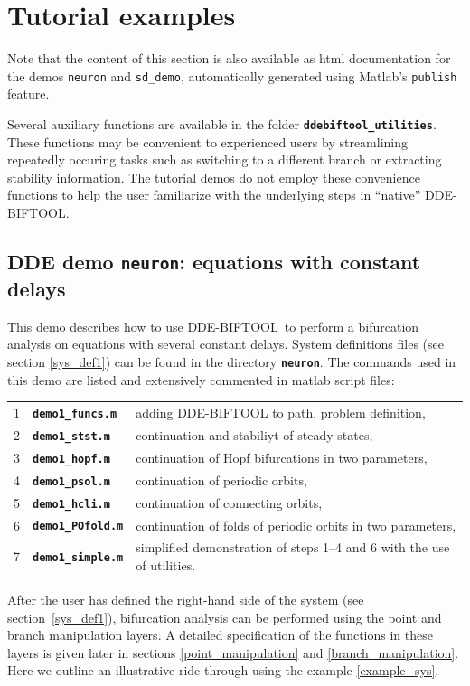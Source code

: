 \documentclass[10pt]{scrartcl}
\newcommand{\DDEBIFCODE}{\textsc{DDE-BIFTOOL}}
\newcommand{\file}[1]{\textbf{\texttt{#1}}}
\newcommand{\blist}[1]{\mbox{\lstinline!#1!}}
\begin{document}
\section{Tutorial examples}\label{demo}
Note that the content of this section is also available as html
documentation for the demos \blist{neuron} and \blist{sd_demo},
automatically generated using Matlab's \texttt{publish} feature.

Several auxiliary functions are available in the folder
\file{ddebiftool\_utilities}. These functions may be convenient to
experienced users by streamlining repeatedly occuring tasks such as
switching to a different branch or extracting stability
information. The tutorial demos do not employ these convenience
functions  to help the user familiarize with the underlying steps in ``native'' \DDEBIFCODE.
\subsection{DDE demo \file{neuron}: equations with constant delays}
\label{ride-through}
This demo describes how to use \DDEBIFCODE\ to perform a bifurcation
analysis on equations with several constant delays.  System
definitions files (see section \ref{sys_def1}) can be found in the
directory \file{neuron}.  The commands used in this demo are listed
and extensively commented in matlab script files:\\
\begin{center}
  \begin{tabular}[t]{rll}
    1 & \file{demo1\_funcs.m} &adding \DDEBIFCODE{} to path, problem definition,\\
    2 & \file{demo1\_stst.m} & continuation and stabiliyt of steady states,\\
    3 & \file{demo1\_hopf.m}& continuation of Hopf bifurcations in two parameters,\\
    4 & \file{demo1\_psol.m} & continuation of periodic orbits,\\[0.5ex]
    5&  \file{demo1\_hcli.m}& continuation of connecting orbits,\\
    6 & \file{demo1\_POfold.m}& continuation of folds of periodic orbits in two 
    parameters,\\
    7 & \file{demo1\_simple.m} & simplified demonstration of steps 1--4 and 6 with the use of utilities.
  \end{tabular}
\end{center}
  
After the user has defined the right-hand side of the system (see
section~\ref{sys_def1}), bifurcation analysis can be performed using
the point and branch manipulation layers. A detailed specification of
the functions in these layers is given later in sections
\ref{point_manipulation} and \ref{branch_manipulation}.  Here
we outline an illustrative ride-through using the example
\eqref{example_sys}.
\end{document}

